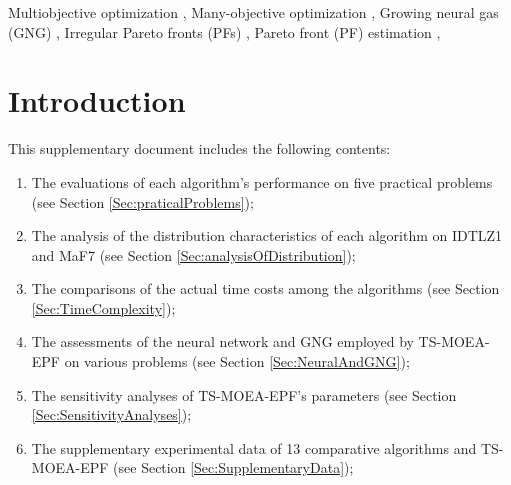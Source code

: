 \documentclass[a4paper,fleqn]{cas-dc}
\newcounter{appendixLetterCounter}
\newcommand{\switchAppendixLetter}[1][1]{
	\addtocounter{appendixLetterCounter}{#1}
	\setcounter{table}{0}
	\setcounter{figure}{0}
	\setcounter{equation}{0}
}
\begin{document}
\begin{sloppypar}

\begin{keywords}
		{Multiobjective} optimization \sep
{Many-objective} optimization \sep
Growing neural gas (GNG) \sep
Irregular Pareto fronts (PFs) \sep 
Pareto front (PF)  estimation \sep
\end{keywords}



\maketitle
\switchAppendixLetter
\section{Introduction}
This supplementary document includes the following contents:
\begin{enumerate}
	\item The evaluations of each algorithm’s performance on five practical problems (see Section \ref{Sec:praticalProblems});  
	\item The analysis of the distribution characteristics of each algorithm on  IDTLZ1 and MaF7  (see Section \ref{Sec:analysisOfDistribution});
	\item The comparisons of the actual time costs among the algorithms (see Section \ref{Sec:TimeComplexity}); 
	\item The assessments of the neural network and GNG employed by TS-MOEA-EPF on various problems (see Section \ref{Sec:NeuralAndGNG});
	\item The sensitivity analyses of TS-MOEA-EPF’s parameters (see Section \ref{Sec:SensitivityAnalyses});
	\item The supplementary experimental data of 13 comparative algorithms and TS-MOEA-EPF (see Section \ref{Sec:SupplementaryData});
\end{enumerate}

\end{sloppypar}
\end{document}

